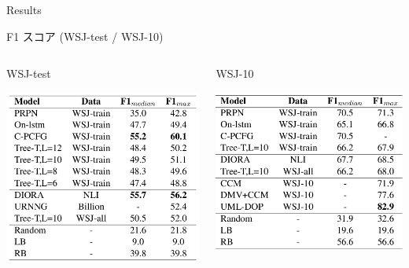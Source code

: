 \documentclass[unicode, 12pt, aspectratio=43]{beamer}
\begin{document}
\begin{frame}[label={sec:orge7938fb}]{Results}
\begin{block}{F1 スコア (WSJ-test / WSJ-10)}
\begin{columns}
\begin{column}{0.5\columnwidth}
\begin{block}{WSJ-test}
\begin{center}
\includegraphics[width=\linewidth]{./figure/Table1.pdf}
\end{center}
\end{block}
\end{column}

\begin{column}{0.5\columnwidth}
\begin{block}{WSJ-10}
\begin{center}
\includegraphics[width=\linewidth]{./figure/Table2.pdf}
\end{center}
\end{block}
\end{column}
\end{columns}
\end{block}
\end{frame}
\end{document}
